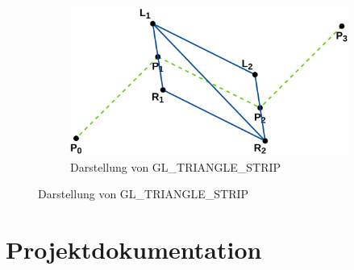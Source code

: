 \documentclass[doktyp=studarbeit]{TUBAFarbeiten}
\begin{document}
\begin{figure}[!htb]
\begin{subfigure}[b]{0.45\textwidth}
        \includegraphics[width=1\linewidth]{Schlangenlinie-8.png}
        \caption{Darstellung von GL\_TRIANGLE\_STRIP}
    \end{subfigure}
    \caption{Darstellung von GL\_TRIANGLE\_STRIP}
	\label{fig:line}
\end{figure}


\section{Projektdokumentation}

\printbibliography[heading=bibintoc]
\end{document}
